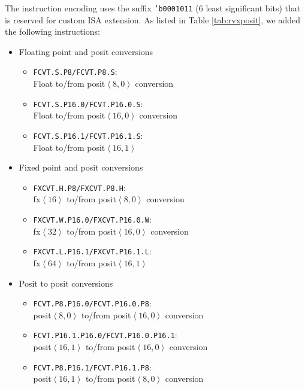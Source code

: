 The instruction encoding uses the suffix \texttt{'b0001011} (6 least significant bits) that is reserved for custom ISA extension.
As listed in Table \ref{tab:rvxposit}, we added the following instructions:
\begin{itemize}
    \item Floating point and posit conversions
    \begin{itemize}
        \item \texttt{FCVT.S.P8/FCVT.P8.S}: \\Float to/from posit$\left<8,0\right>$ conversion
        \item \texttt{FCVT.S.P16.0/FCVT.P16.0.S}:\\ Float to/from posit$\left<16,0\right>$ conversion
        \item \texttt{FCVT.S.P16.1/FCVT.P16.1.S}: \\Float to/from posit$\left<16,1\right>$
    \end{itemize}
    \item Fixed point and posit conversions
    \begin{itemize}
        \item \texttt{FXCVT.H.P8/FXCVT.P8.H}: \\fx$\left<16\right>$ to/from posit$\left<8,0\right>$ conversion
        \item \texttt{FXCVT.W.P16.0/FXCVT.P16.0.W}:\\ fx$\left<32\right>$ to/from posit$\left<16,0\right>$ conversion
        \item \texttt{FXCVT.L.P16.1/FXCVT.P16.1.L}: \\fx$\left<64\right>$ to/from posit$\left<16,1\right>$
    \end{itemize}   
    \item Posit to posit conversions
    \begin{itemize}
        \item \texttt{FCVT.P8.P16.0/FCVT.P16.0.P8}: \\posit$\left<8,0\right>$ to/from posit$\left<16,0\right>$ conversion
        \item \texttt{FCVT.P16.1.P16.0/FCVT.P16.0.P16.1}:\\
        posit$\left<16,1\right>$ to/from posit$\left<16,0\right>$ conversion
        \item \texttt{FCVT.P8.P16.1/FCVT.P16.1.P8}:
        \\posit$\left<16,1\right>$ to/from posit$\left<8,0\right>$ conversion
        \end{itemize}       
\end{itemize}

